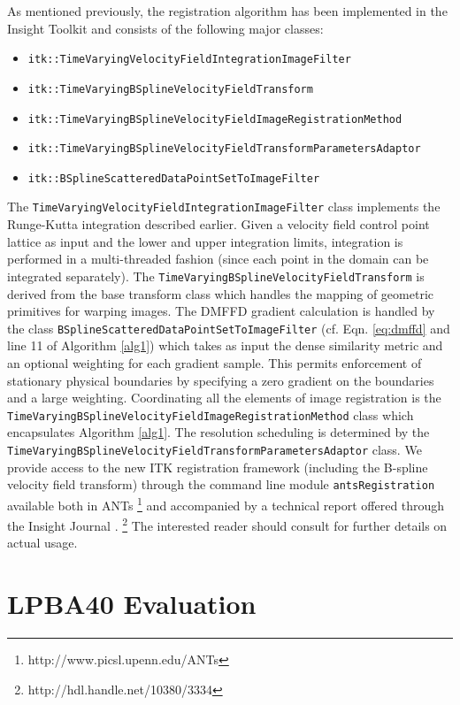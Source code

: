 \documentclass{llncs}
\begin{document}
As mentioned previously, the registration algorithm has been implemented in the
Insight Toolkit and consists of the following major classes: 
\begin{itemize}
  \item \verb#itk::TimeVaryingVelocityFieldIntegrationImageFilter#
  \item \verb#itk::TimeVaryingBSplineVelocityFieldTransform#
  \item \verb#itk::TimeVaryingBSplineVelocityFieldImageRegistrationMethod#
  \item \verb#itk::TimeVaryingBSplineVelocityFieldTransformParametersAdaptor#
  \item \verb#itk::BSplineScatteredDataPointSetToImageFilter#
\end{itemize}
The \verb#TimeVaryingVelocityFieldIntegrationImageFilter# class implements
the Runge-Kutta integration described earlier.  Given a 
velocity field control point lattice as 
input and the lower and upper integration limits, integration is performed 
in a multi-threaded fashion (since each point in the domain
can be integrated separately).  The \verb#TimeVaryingBSplineVelocityFieldTransform# 
is derived from the base transform class which handles the mapping of geometric primitives
for warping images.  The DMFFD gradient calculation  is handled by the class \verb#BSplineScatteredDataPointSetToImageFilter# (cf. Eqn. \ref{eq:dmffd} and line 11
of Algorithm \ref{alg1}) which takes as input the dense similarity metric and an optional
weighting for each gradient sample.  This permits enforcement of stationary physical
boundaries by specifying a zero gradient on the boundaries and a large weighting.
Coordinating all the elements of image registration is the
\verb#TimeVaryingBSplineVelocityFieldImageRegistrationMethod# class which
encapsulates Algorithm \ref{alg1}.  The resolution scheduling is determined
by the \verb#TimeVaryingBSplineVelocityFieldTransformParametersAdaptor# class.
We provide access to the new ITK 
registration framework (including the B-spline velocity field transform) 
through the command line module \verb#antsRegistration# available both in ANTs%
\footnote{
http://www.picsl.upenn.edu/ANTs
}
and accompanied by a technical report offered through the Insight Journal
\cite{tustison2012}.%
\footnote{
http://hdl.handle.net/10380/3334
}
The interested reader should consult \cite{tustison2012} for further details on 
actual usage.

\section{LPBA40 Evaluation}
\end{document}

